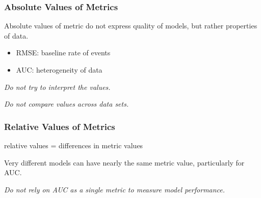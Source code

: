 \documentclass[bigger]{beamer}
\begin{document}
\begin{frame}
  \frametitle{Absolute Values of Metrics}

  \begin{block}{}
    Absolute values of metric do not express quality of models, but rather
    properties of data.
  \end{block}

  \medskip

  \begin{itemize}
  \item RMSE: baseline rate of events
  \item AUC: heterogeneity of data
  \end{itemize}

  \bigskip

\emph{Do not try to interpret the values.}

\emph{Do not compare values across data sets.}

\end{frame}

\begin{frame}
  \frametitle{Relative Values of Metrics}

  relative values = differences in metric values

  \begin{block}{}
    Very different models can have nearly the same metric value, particularly
    for AUC.
  \end{block}

  \bigskip

  \emph{Do not rely on AUC as a single metric to measure model performance.}  
\end{frame}
\end{document}
